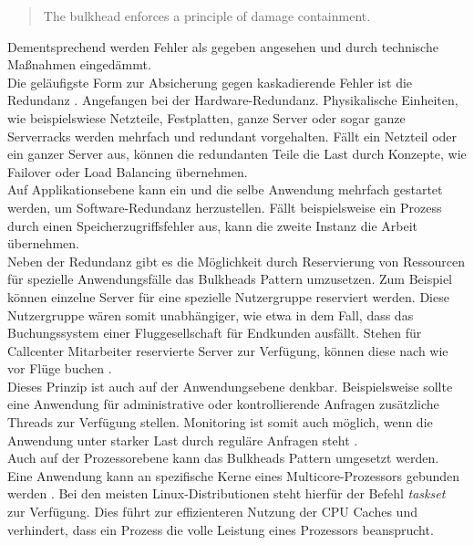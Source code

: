 \begin{quotation}
The bulkhead enforces a principle of damage containment.
\end{quotation}

Dementsprechend werden Fehler als gegeben angesehen und durch technische Maßnahmen eingedämmt.\\

Die geläufigste Form zur Absicherung gegen kaskadierende Fehler ist die Redundanz \cite{friedrichsen_unkaputtbar_2014} \cite[S.~95]{nygard_release_2007}. Angefangen bei der Hardware-Redundanz. Physikalische Einheiten, wie beispielswiese Netzteile, Festplatten, ganze Server oder sogar ganze Serverracks werden mehrfach und redundant vorgehalten. Fällt ein Netzteil oder ein ganzer Server aus, können die redundanten Teile die Last durch Konzepte, wie Failover oder Load Balancing übernehmen.\\
Auf Applikationsebene kann ein und die selbe Anwendung mehrfach gestartet werden, um Software-Redundanz herzustellen. Fällt beispielsweise ein Prozess durch einen Speicherzugriffsfehler aus, kann die zweite Instanz die Arbeit übernehmen.\\

Neben der Redundanz gibt es die Möglichkeit durch Reservierung von Ressourcen für spezielle Anwendungsfälle das Bulkheads Pattern umzusetzen. Zum Beispiel können einzelne Server für eine spezielle Nutzergruppe reserviert werden. Diese Nutzergruppe wären somit unabhängiger, wie etwa in dem Fall, dass das Buchungssystem einer Fluggesellschaft für Endkunden ausfällt. Stehen für Callcenter Mitarbeiter reservierte Server zur Verfügung, können diese nach wie vor Flüge buchen \cite[S.~96]{nygard_release_2007}.\\

Dieses Prinzip ist auch auf der Anwendungsebene denkbar. Beispielsweise sollte eine Anwendung für administrative oder kontrollierende Anfragen zusätzliche Threads zur Verfügung stellen. Monitoring ist somit auch möglich, wenn die Anwendung unter starker Last durch reguläre Anfragen steht \cite[S.~98]{nygard_release_2007}.\\

Auch auf der Prozessorebene kann das Bulkheads Pattern umgesetzt werden. Eine Anwendung kann an spezifische Kerne eines Multicore-Prozessors gebunden werden \cite[S.~97]{nygard_release_2007}. Bei den meisten Linux-Distributionen steht hierfür der Befehl \textit{taskset} zur Verfügung. Dies führt zur effizienteren Nutzung der CPU Caches und verhindert, dass ein Prozess die volle Leistung eines Prozessors beansprucht.\\

